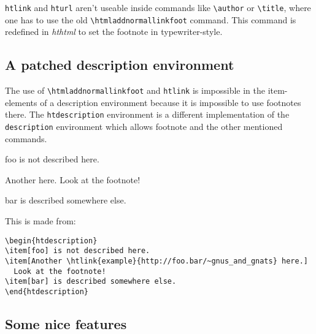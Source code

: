 \documentclass[11pt,a4paper]{article}
\begin{document}
\verb|htlink| and \verb|hturl| aren't useable inside commands like
\verb|\author| or \verb|\title|, where one has to use the old
\verb|\htmladdnormallinkfoot| command.  This command is redefined in
\emph{hthtml} to set the footnote in typewriter-style. 

\subsection{A patched description environment}

The use of \verb|\htmladdnormallinkfoot| and \verb|htlink| is
impossible in the item-elements of a description environment because
it is impossible to use footnotes there.  The \verb|htdescription|
environment is a different implementation of the \verb|description|
environment which allows footnote and the other mentioned commands.

\begin{htdescription}
\item[foo] is not described here.
\item[Another \htlink{example}{http://foo.bar/~gnus_and_gnats} here.]
  Look at the footnote!
\item[bar] is described somewhere else.
\end{htdescription}

This is made from:
\begin{verbatim}
\begin{htdescription}
\item[foo] is not described here.
\item[Another \htlink{example}{http://foo.bar/~gnus_and_gnats} here.]
  Look at the footnote!
\item[bar] is described somewhere else.
\end{htdescription}
\end{verbatim}

\subsection{Some nice features}
\end{document}

